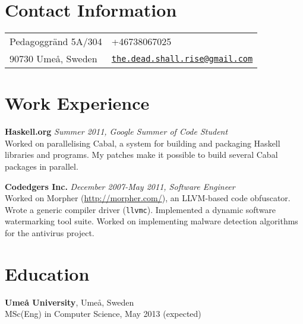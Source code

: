 \documentclass[margin,line]{res}
\begin{document}

\begin{resume}
\section{\sc Contact Information}
\vspace{.05in}
\begin{tabular}{@{}p{2in}p{4in}}
Pedagoggränd 5A/304&
+46738067025\\
90730 Umeå, Sweden&
\href{mailto:the.dead.shall.rise@gmail.com}
{\texttt{the.dead.shall.rise@gmail.com}}\\
\end{tabular}

\section{\sc Work Experience}

{\bf Haskell.org} \hfill {\it Summer 2011, Google Summer of Code Student}\\
Worked on parallelising Cabal, a system for building and packaging Haskell
libraries and programs. My patches make it possible to build several Cabal
packages in parallel.

{\bf Codedgers Inc.} \hfill {\it December 2007-May 2011, Software Engineer}\\
Worked on Morpher (\url{http://morpher.com/}), an LLVM-based code
obfuscator. Wrote a generic compiler driver (\texttt{llvmc}). Implemented a
dynamic software watermarking tool suite. Worked on implementing malware
detection algorithms for the antivirus project.



\section{\sc Education}
{\bf Umeå University}, Umeå, Sweden\\
MSc(Eng) in Computer Science, May 2013 (expected)


\end{resume}
\end{document}
